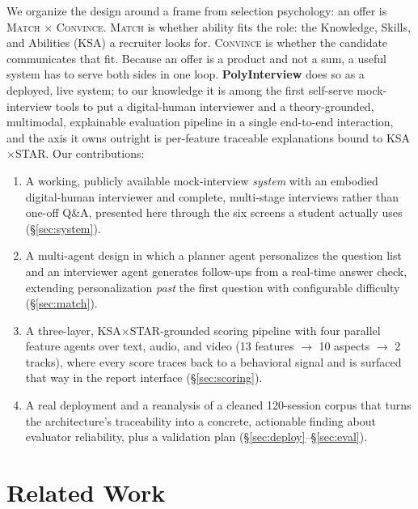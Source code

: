 \documentclass[11pt]{article}
\begin{document}
We organize the design around a frame from selection psychology: an offer is \textsc{Match} $\times$ \textsc{Convince}. \textsc{Match} is whether ability fits the role: the Knowledge, Skills, and Abilities (KSA) a recruiter looks for. \textsc{Convince} is whether the candidate communicates that fit. Because an offer is a product and not a sum, a useful system has to serve both sides in one loop. \textbf{PolyInterview} does so as a deployed, live system; to our knowledge it is among the first self-serve mock-interview tools to put a digital-human interviewer and a theory-grounded, multimodal, explainable evaluation pipeline in a single end-to-end interaction, and the axis it owns outright is per-feature traceable explanations bound to KSA$\times$STAR. Our contributions:
\begin{enumerate}[noitemsep,topsep=2pt,leftmargin=*]
  \item A working, publicly available mock-interview \emph{system} with an embodied digital-human interviewer and complete, multi-stage interviews rather than one-off Q\&A, presented here through the six screens a student actually uses (\S\ref{sec:system}).
  \item A multi-agent design in which a planner agent personalizes the question list and an interviewer agent generates follow-ups from a real-time answer check, extending personalization \emph{past} the first question with configurable difficulty (\S\ref{sec:match}).
  \item A three-layer, KSA$\times$STAR-grounded scoring pipeline with four parallel feature agents over text, audio, and video (13 features $\rightarrow$ 10 aspects $\rightarrow$ 2 tracks), where every score traces back to a behavioral signal and is surfaced that way in the report interface (\S\ref{sec:scoring}).
  \item A real deployment and a reanalysis of a cleaned 120-session corpus that turns the architecture's traceability into a concrete, actionable finding about evaluator reliability, plus a validation plan (\S\ref{sec:deploy}--\S\ref{sec:eval}).
\end{enumerate}

\section{Related Work}
\label{sec:related}
\end{document}
